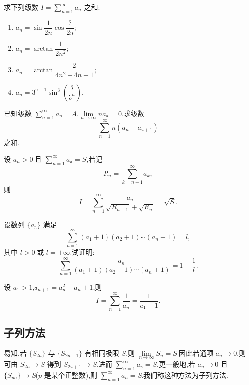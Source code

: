 \documentclass[../数学分析培优讲义.tex]{subfiles}
\begin{document}
\begin{example}
求下列级数 $\displaystyle I=\sum\limits_{n=1}^{\infty}a_n$ 之和:
\begin{enumerate}[label=(\arabic*)]
    \item $\displaystyle a_n=\sin\dfrac{1}{2n}\cos\dfrac{3}{2n}$;
    \item $\displaystyle a_n=\arctan\dfrac{1}{2n^2}$;
    \item $\displaystyle a_n=\arctan\dfrac{2}{4n^2-4n+1}$;
    \item $\displaystyle a_n=3^{n-1}\sin^3\left(\dfrac{\theta}{3^n}\right)$.
\end{enumerate}
\end{example}
\exampleblank

\begin{example}
已知级数 $\displaystyle\sum\limits_{n=1}^{\infty}a_n=A$,$\displaystyle\lim\limits_{n\to\infty}na_n=0$,求级数
\[
    \sum\limits_{n=1}^{\infty}n(a_n-a_{n+1})
\]
之和.
\end{example}
\exampleblank

\begin{example}
设 $a_n>0$ 且 $\displaystyle\sum\limits_{n=1}^{\infty}a_n=S$,若记
\[
    R_n=\sum\limits_{k=n+1}^{\infty}a_k,
\]
则
\[
    I=\sum\limits_{n=1}^{\infty}\dfrac{a_n}{\sqrt{R_{n-1}}+\sqrt{R_n}}=\sqrt{S}.
\]
\end{example}
\exampleblank

\begin{example}
设数列 $\{a_n\}$ 满足
\[
    \sum\limits_{n=1}^{\infty}(a_1+1)(a_2+1)\cdots(a_n+1)=l,
\]
其中 $l>0$ 或 $l=+\infty$.试证明:
\[
    \sum\limits_{n=1}^{\infty}
    \dfrac{a_n}{(a_1+1)(a_2+1)\cdots(a_n+1)}
    =1-\dfrac{1}{l}.
\]
\end{example}
\exampleblank

\begin{example}
设 $a_1>1$,$a_{n+1}=a_n^2-a_n+1$,则
\[
    I=\sum\limits_{n=1}^{\infty}\dfrac{1}{a_n}=\dfrac{1}{a_1-1}.
\]
\end{example}
\exampleblank


\newpage

\subsection{子列方法}

易知,若 $\{S_{2n}\}$ 与 $\{S_{2n+1}\}$ 有相同极限 $S$,则 $\displaystyle\lim\limits_{n\to\infty}S_n=S$.因此若通项 $a_n\to0$,则可由 $S_{2n}\to S$ 得到 $S_{2n+1}\to S$,进而 $\displaystyle\sum\limits_{n=1}^{\infty}a_n=S$.更一般地,若 $a_n\to0$ 且 $\{S_{pn}\}\to S$($p$ 是某个正整数),则 $\displaystyle\sum\limits_{n=1}^{\infty}a_n=S$.我们称这种方法为子列方法.
\end{document}
